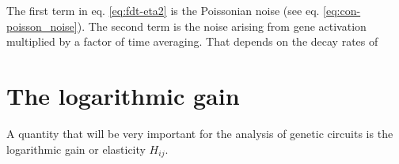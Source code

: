 The first term in eq. \eqref{eq:fdt-eta2} is the Poissonian noise (see eq. \eqref{eq:con-poisson_noise}). The second term is the noise arising from gene activation multiplied by a factor of time averaging. That depends on the decay rates of


\section{The logarithmic gain}

A quantity that will be very important for the analysis of genetic circuits is the logarithmic gain or elasticity $H_{ij}$. 
\label{sec:log_gain}
